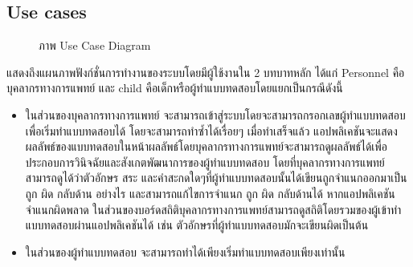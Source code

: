 \documentclass[12pt,oneside,openright,a4paper]{cpe-thai-project}
\begin{document}
\subsection{Use cases}
\begin{figure}[!ht]\centering
  \setlength{\fboxrule}{0.2mm} %
  \setlength{\fboxsep}{1cm}
  \caption{ภาพ Use Case Diagram}\label{fig:usecase}
\end{figure}
แสดงถึงแผนภาพฟังก์ชั่นการทำงานของระบบโดยมีผู้ใช้งานใน 2 บทบาทหลัก ได้แก่ Personnel คือบุคลากรทางการแพทย์ และ child คือเด็กหรือผู้ทำแบบทดสอบโดยแยกเป็นกรณีดังนี้
\begin{itemize}
  \item ในส่วนของบุคลากรทางการแพทย์ จะสามารถเข้าสู่ระบบโดยจะสามารถกรอกเลขผู้ทำแบบทดสอบเพื่อเริ่มทำแบบทดสอบได้ โดยจะสามารถทำซ้ำได้เรื่อยๆ เมื่อทำเสร็จแล้ว แอปพลิเคชันจะแสดงผลลัพธ์ของแบบทดสอบในหน้าผลลัพธ์โดยบุคลากรทางการแพทย์จะสามารถดูผลลัพธ์ได้เพื่อประกอบการวินิจฉัยและสังเกตพัฒนาการของผู้ทำแบบทดสอบ โดยที่บุคลากรทางการแพทย์สามารถดูได้ว่าตัวอักษร สระ และคำสะกดใดๆที่ผู้ทำแบบทดสอบนั้นได้เขียนถูกจำแนกออกมาเป็น ถูก ผิด กลับด้าน อย่างไร และสามารถแก้ไขการจำแนก 
  ถูก ผิด กลับด้านได้ หากแอปพลิเคชันจำแนกผิดพลาด ในส่วนของบอร์ดสถิติบุคลากรทางการแพทย์สามารถดูสถิติโดยรวมของผู้เข้าทำแบบทดสอบผ่านแอปพลิเคชันได้ เช่น ตัวอักษรที่ผู้ทำแบบทดสอบมักจะเขียนผิดเป็นต้น 
  \item ในส่วนของผู้ทำแบบทดสอบ จะสามารถทำได้เพียงเริ่มทำแบบทดสอบเพียงเท่านั้น 
\end{itemize}
\end{document}
